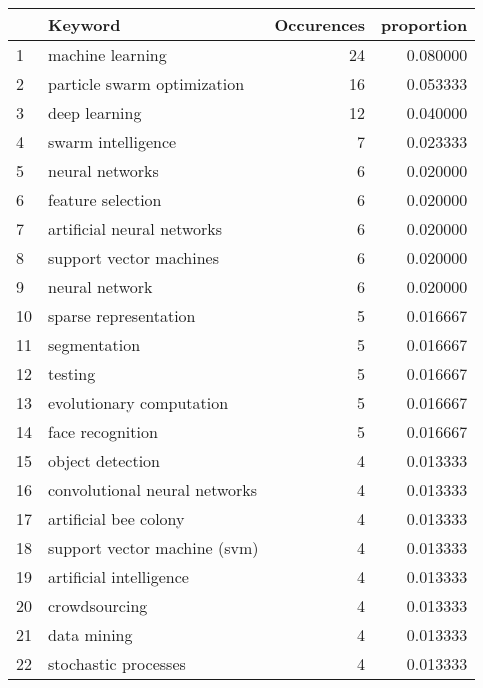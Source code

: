 \begin{tabular}{llrr}
\toprule
{} &                            Keyword &  Occurences &  proportion \\
\midrule
1  &                   machine learning &          24 &    0.080000 \\
2  &        particle swarm optimization &          16 &    0.053333 \\
3  &                      deep learning &          12 &    0.040000 \\
4  &                 swarm intelligence &           7 &    0.023333 \\
5  &                    neural networks &           6 &    0.020000 \\
6  &                  feature selection &           6 &    0.020000 \\
7  &         artificial neural networks &           6 &    0.020000 \\
8  &            support vector machines &           6 &    0.020000 \\
9  &                     neural network &           6 &    0.020000 \\
10 &              sparse representation &           5 &    0.016667 \\
11 &                       segmentation &           5 &    0.016667 \\
12 &                            testing &           5 &    0.016667 \\
13 &           evolutionary computation &           5 &    0.016667 \\
14 &                   face recognition &           5 &    0.016667 \\
15 &                   object detection &           4 &    0.013333 \\
16 &      convolutional neural networks &           4 &    0.013333 \\
17 &              artificial bee colony &           4 &    0.013333 \\
18 &       support vector machine (svm) &           4 &    0.013333 \\
19 &            artificial intelligence &           4 &    0.013333 \\
20 &                      crowdsourcing &           4 &    0.013333 \\
21 &                        data mining &           4 &    0.013333 \\
22 &               stochastic processes &           4 &    0.013333 \\

\end{tabular}
